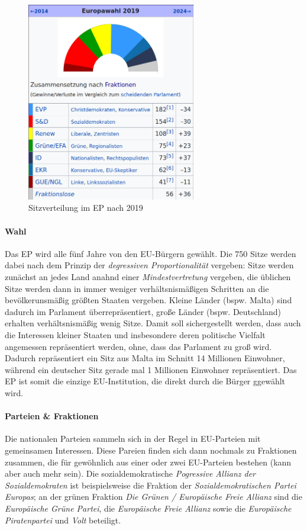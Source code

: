 \documentclass{article}
\begin{document}
	\begin{figure}
		\centering
  		\includegraphics[width=20em]{eu_ep_2019.png}
  		\caption{Sitzverteilung im EP nach 2019}
  		\label{fig:eu_2019}
	\end{figure}

	\paragraph{Wahl}
	Das EP wird alle fünf Jahre von den EU-Bürgern gewählt. Die 750 Sitze werden dabei nach dem Prinzip der \textit{degressiven Proportionalität} vergeben: Sitze werden zunächst an jedes Land anahnd einer \textit{Mindestvertretung} vergeben, die üblichen Sitze werden dann in immer weniger verhältsnismäßigen Schritten an die bevölkerunsmäßig größten Staaten vergeben. Kleine Länder (bspw. Malta) sind dadurch im Parlament überrepräsentiert, große Länder (bspw. Deutschland) erhalten verhältsnismäßig wenig Sitze. Damit soll sichergestellt werden, dass auch die Interessen kleiner Staaten und insbesondere deren politische Vielfalt angemessen repräsentiert werden, ohne, dass das Parlament zu groß wird. Dadurch repräsentiert ein Sitz aus Malta im Schnitt 14 Millionen Einwohner, während ein deutscher Sitz gerade mal 1 Millionen Einwohner repräsentiert. Das EP ist somit die einzige EU-Institution, die direkt durch die Bürger ggewählt wird.

	\paragraph{Parteien \& Fraktionen}
	Die nationalen Parteien sammeln sich in der Regel in EU-Parteien mit gemeinsamen Interessen. Diese Pareien finden sich dann nochmals zu Fraktionen zusammen, die für gewöhnlich aus einer oder zwei EU-Parteien bestehen (kann aber auch mehr sein). Die sozialdemokratische \textit{Pogressive Allianz der Sozialdemokraten} ist beispielsweise die Fraktion der \textit{Sozialdemokratischen Partei Europas}; an der grünen Fraktion \textit{Die Grünen / Europäische Freie Allianz} sind die \textit{Europäische Grüne Partei}, die \textit{Europäische Freie Allianz} sowie die \textit{Europäische Piratenpartei} und \textit{Volt} beteiligt. 
\end{document}
